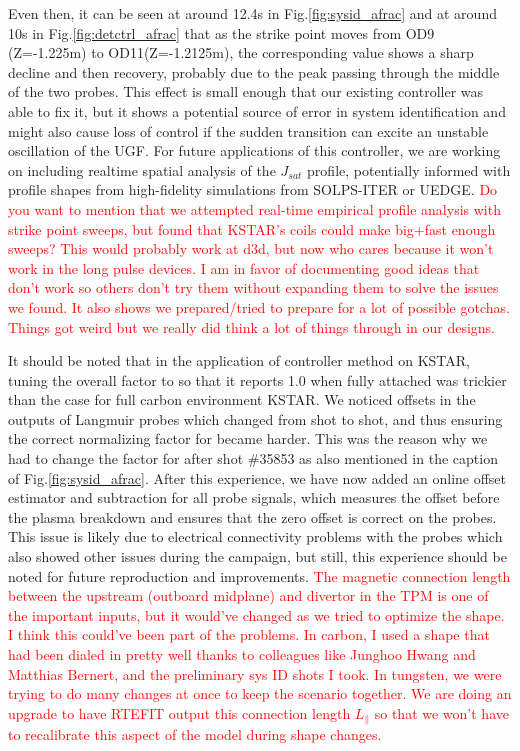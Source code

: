 Even then, it can be seen at around 12.4s in Fig.\ref{fig:sysid_afrac} and at around 10s in Fig.\ref{fig:detctrl_afrac} that as the strike point moves from OD9 (Z=-1.225m) to OD11(Z=-1.2125m), the corresponding \Afrac value shows a sharp decline and then recovery, probably due to the peak passing through the middle of the two probes.
This effect is small enough that our existing controller was able to fix it, but it shows a potential source of error in system identification and might also cause loss of control if the sudden transition can excite an unstable oscillation of the \ac{UGF}.
For future applications of this controller, we are working on including realtime spatial analysis of the $J_{sat}$ profile, potentially informed with profile shapes from high-fidelity simulations from SOLPS-ITER or UEDGE.
\textcolor{red}{Do you want to mention that we attempted real-time empirical profile analysis with strike point sweeps, but found that KSTAR's coils could make big+fast enough sweeps? This would probably work at d3d, but now who cares because it won't work in the long pulse devices. I am in favor of documenting good ideas that don't work so others don't try them without expanding them to solve the issues we found. It also shows we prepared/tried to prepare for a lot of possible gotchas. Things got weird but we really did think a lot of things through in our designs.}

It should be noted that in the application of \Afrac controller method on KSTAR, tuning the overall factor to \Afrac so that it reports 1.0 when fully attached was trickier than the case for full carbon environment KSTAR\cite{Eldon_2022_PPCF}.
We noticed offsets in the outputs of Langmuir probes which changed from shot to shot, and thus ensuring the correct normalizing factor for \Afrac became harder.
This was the reason why we had to change the factor for \Afrac after shot \#35853 as also mentioned in the caption of Fig.\ref{fig:sysid_afrac}.
After this experience, we have now added an online offset estimator and subtraction for all probe signals, which measures the offset before the plasma breakdown and ensures that the zero offset is correct on the probes.
This issue is likely due to electrical connectivity problems with the probes which also showed other issues during the campaign, but still, this experience should be noted for future reproduction and improvements.
\textcolor{red}{The magnetic connection length between the upstream (outboard midplane) and divertor in the TPM is one of the important inputs, but it would've changed as we tried to optimize the shape. I think this could've been part of the problems. In carbon, I used a shape that had been dialed in pretty well thanks to colleagues like Junghoo Hwang and Matthias Bernert, and the preliminary sys ID shots I took. In tungsten, we were trying to do many changes at once to keep the scenario together. We are doing an upgrade to have RTEFIT output this connection length $L_\parallel$ so that we won't have to recalibrate this aspect of the model during shape changes.}

